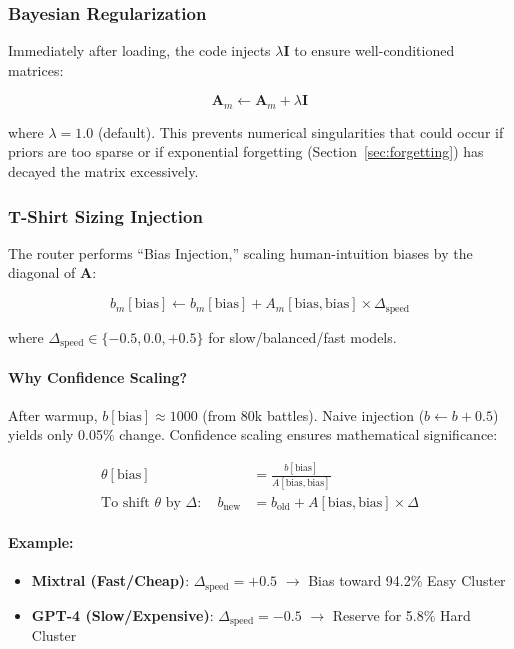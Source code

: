 \documentclass[sigconf]{acmart}
\begin{document}
\subsubsection{Bayesian Regularization}

Immediately after loading, the code injects $\lambda \mathbf{I}$ to ensure well-conditioned matrices:

\begin{equation}
\mathbf{A}_m \leftarrow \mathbf{A}_m + \lambda \mathbf{I}
\label{eq:regularization}
\end{equation}

where $\lambda = 1.0$ (default). This prevents numerical singularities that could occur if priors are too sparse or if exponential forgetting (Section~\ref{sec:forgetting}) has decayed the matrix excessively.

\subsubsection{T-Shirt Sizing Injection}

The router performs ``Bias Injection,'' scaling human-intuition biases by the diagonal of $\mathbf{A}$:

\begin{equation}
b_m[\text{bias}] \leftarrow b_m[\text{bias}] + A_m[\text{bias}, \text{bias}] \times \Delta_{\text{speed}}
\label{eq:bias_injection}
\end{equation}

where $\Delta_{\text{speed}} \in \{-0.5, 0.0, +0.5\}$ for slow/balanced/fast models.

\paragraph{Why Confidence Scaling?}
After warmup, $b[\text{bias}] \approx 1000$ (from 80k battles). Naive injection ($b \leftarrow b + 0.5$) yields only 0.05\% change. Confidence scaling ensures mathematical significance:

\begin{align}
\theta[\text{bias}] &= \frac{b[\text{bias}]}{A[\text{bias}, \text{bias}]} \\
\text{To shift } \theta \text{ by } \Delta: \quad b_{\text{new}} &= b_{\text{old}} + A[\text{bias}, \text{bias}] \times \Delta
\end{align}

\paragraph{Example:}
\begin{itemize}
    \item \textbf{Mixtral (Fast/Cheap)}: $\Delta_{\text{speed}} = +0.5$ $\rightarrow$ Bias toward 94.2\% Easy Cluster
    \item \textbf{GPT-4 (Slow/Expensive)}: $\Delta_{\text{speed}} = -0.5$ $\rightarrow$ Reserve for 5.8\% Hard Cluster
\end{itemize}
\end{document}
